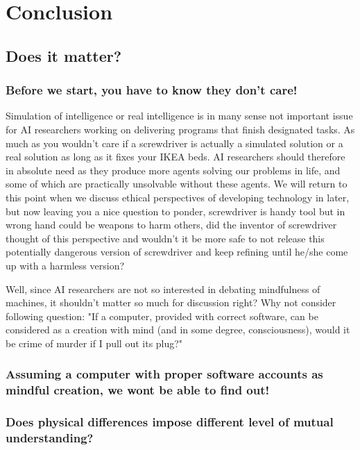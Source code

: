 \documentclass[11pt]{article}
\newenvironment{sketch}{\color{dark-green-2}}{\ignorespacesafterend}
\newenvironment{draft}{\color{dark-cornflower-blue-2}}{\ignorespacesafterend}
\begin{document}
\section{Conclusion}
\label{sec:conclusion}

\subsection{Does it matter?}

\subsubsection*{Before we start, you have to know they don't care!}
\begin{draft}
Simulation of intelligence or real intelligence is in many sense not important issue for AI researchers working on delivering programs that finish designated tasks. As much as you wouldn't care if a screwdriver is actually a simulated solution or a real solution as long as it fixes your IKEA beds. AI researchers should therefore in absolute need as they produce more agents solving our problems in life, and some of which are practically unsolvable without these agents. We will return to this point when we discuss ethical perspectives of developing technology in later, but now leaving you a nice question to ponder, screwdriver is handy tool but in wrong hand could be weapons to harm others, did the inventor of screwdriver thought of this perspective and wouldn’t it be more safe to not release this potentially dangerous version of screwdriver and keep refining until he/she come up with a harmless version?
  
Well, since AI researchers are not so interested in debating mindfulness of machines, it shouldn't matter so much for discussion right? Why not consider following question: "If a computer, provided with correct software, can be considered as a creation with mind (and in some degree, consciousness), would it be crime of murder if I pull out its plug?"
\end{draft}

\begin{sketch}
\subsubsection*{Assuming a computer with proper software accounts as mindful creation, we wont be able to find out!}

\subsubsection*{Does physical differences impose different level of mutual understanding?}
\end{sketch}
\end{document}
